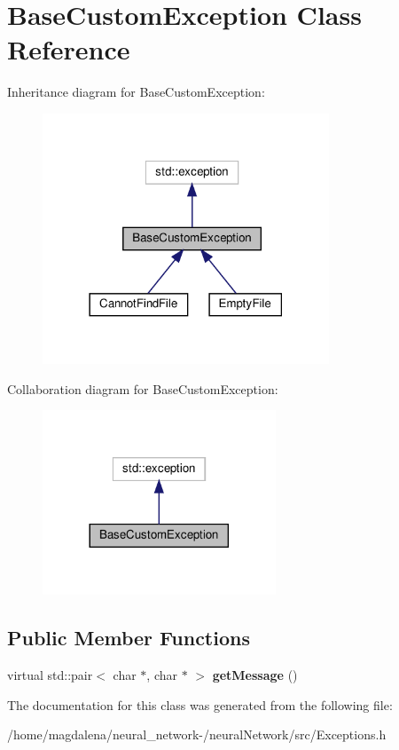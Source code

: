 \hypertarget{classBaseCustomException}{}\section{Base\+Custom\+Exception Class Reference}
\label{classBaseCustomException}


Inheritance diagram for Base\+Custom\+Exception\+:
\nopagebreak
\begin{figure}[H]
\begin{center}
\leavevmode
\includegraphics[width=242pt]{classBaseCustomException__inherit__graph}
\end{center}
\end{figure}


Collaboration diagram for Base\+Custom\+Exception\+:
\nopagebreak
\begin{figure}[H]
\begin{center}
\leavevmode
\includegraphics[width=197pt]{classBaseCustomException__coll__graph}
\end{center}
\end{figure}
\subsection*{Public Member Functions}
\begin{DoxyCompactItemize}
\item 
\mbox{\label{classBaseCustomException_a55c28748e3f2aa06d3938ace39e17272}} 
virtual std\+::pair$<$ char $\ast$, char $\ast$ $>$ {\bfseries get\+Message} ()
\end{DoxyCompactItemize}


The documentation for this class was generated from the following file\+:\begin{DoxyCompactItemize}
\item 
/home/magdalena/neural\+\_\+network-\//neural\+Network/src/Exceptions.\+h\end{DoxyCompactItemize}
